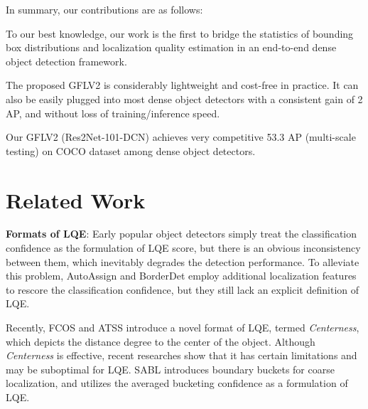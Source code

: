 \documentclass[10pt,twocolumn,letterpaper]{article}
\begin{document}
In summary, our contributions are as follows:

 To our best knowledge, our work is the first to bridge the statistics of 
bounding box distributions and 
localization quality estimation in an end-to-end dense object detection 
framework.

 The proposed GFLV2 is considerably lightweight and cost-free in practice. It can also be easily plugged into most dense object detectors with a consistent gain of 2 AP, and without loss of training/inference speed.
	
 
Our GFLV2 (Res2Net-101-DCN)
achieves very competitive 53.3 AP (multi-scale testing) on COCO dataset among dense object detectors.






\section{Related Work}
\noindent\textbf{Formats of LQE}: 
Early popular object detectors \cite{girshick2015fast,ren2015faster,cai2018cascade,he2017mask} 
simply treat the classification confidence as the formulation of LQE score,
but there is an obvious inconsistency between them, which inevitably degrades the detection performance.
To alleviate this problem, AutoAssign \cite{zhu2020autoassign} and BorderDet \cite{qiu2020borderdet} employ additional 
localization features to rescore the classification confidence, but they still lack an explicit definition of LQE. 

Recently, FCOS \cite{tian2019fcos} and ATSS \cite{zhang2019bridging} introduce a novel format of LQE, termed \emph{Centerness}, which depicts the distance degree to the center of the object.
Although \emph{Centerness} is 
effective,
recent researches \cite{li2020generalized,zhang2020varifocalnet} show that it has certain limitations and may be suboptimal for LQE.
SABL \cite{wang2019side} introduces boundary buckets for coarse localization, and utilizes the averaged bucketing confidence as a formulation of LQE.
\end{document}

